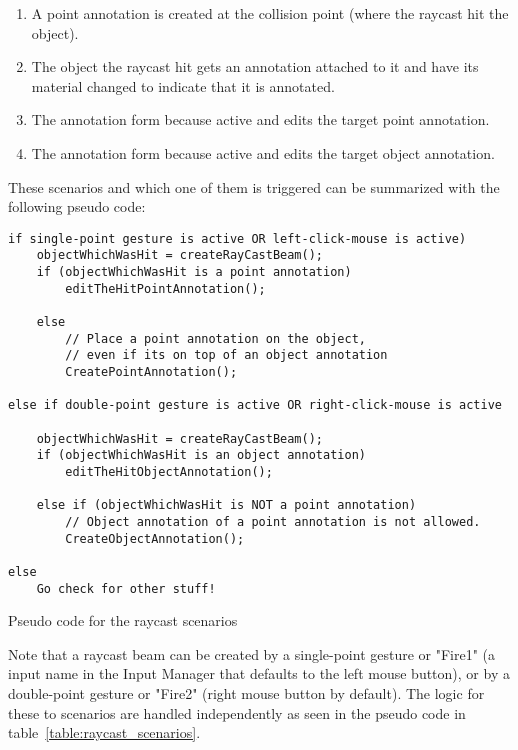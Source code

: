 \begin{enumerate}
    \item A point annotation is created at the collision point (where the raycast hit the object).
    \item The object the raycast hit gets an annotation attached to it and have its material changed to indicate that it is annotated.
    \item The annotation form because active and edits the target point annotation.
    \item The annotation form because active and edits the target object annotation.
\end{enumerate}
 
These scenarios and which one of them is triggered can be summarized with the following pseudo code:

\begin{table}
\label{table:raycast_scenarios}
\begin{lstlisting}
if single-point gesture is active OR left-click-mouse is active)
    objectWhichWasHit = createRayCastBeam();
    if (objectWhichWasHit is a point annotation)
        editTheHitPointAnnotation();

    else 
        // Place a point annotation on the object, 
        // even if its on top of an object annotation
        CreatePointAnnotation();  

else if double-point gesture is active OR right-click-mouse is active
    
    objectWhichWasHit = createRayCastBeam();
    if (objectWhichWasHit is an object annotation)
        editTheHitObjectAnnotation();

    else if (objectWhichWasHit is NOT a point annotation)
        // Object annotation of a point annotation is not allowed.
        CreateObjectAnnotation(); 

else 
    Go check for other stuff!                                                                 
\end{lstlisting}
\caption[Pseudo code for the raycast scenarios]{Pseudo code for the raycast scenarios} 
\end{table}

Note that a raycast beam can be created by a single-point gesture or "Fire1" (a input name in the Input Manager that defaults to the left mouse button), or 
by a double-point gesture or "Fire2" (right mouse button by default). The logic for these to scenarios are handled independently as seen in the pseudo code in 
table~\vref{table:raycast_scenarios}. %

